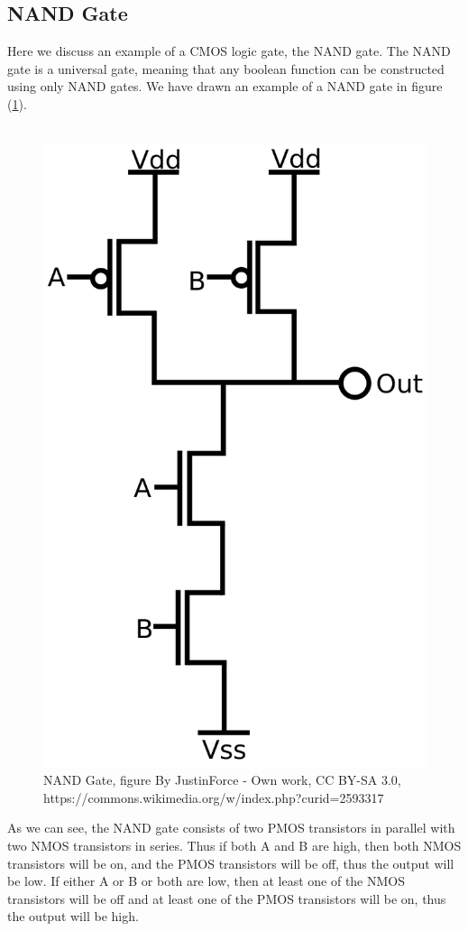 \documentclass[
  reprint,
  amsmath,amssymb,
  aps
]{revtex4-1}
\begin{document}
\subsection{NAND Gate}
Here we discuss an example of a CMOS logic gate, the NAND gate. 
The NAND gate is a universal gate, meaning that any boolean function can be constructed using only NAND gates. We have 
drawn an example of a NAND gate in figure (\ref{fig: NAND gate}).\\\\
\begin{figure}[H]
    \centering
    \includegraphics[width=0.75\linewidth]{cmos_nand_gate.png}
    \caption{NAND Gate, figure By JustinForce - Own work, CC BY-SA 3.0, https://commons.wikimedia.org/w/index.php?curid=2593317}
    \label{fig: NAND gate}
\end{figure}
As we can see, the NAND gate consists of two PMOS transistors in parallel with two NMOS transistors in series. Thus if both A and 
B are high, then both NMOS transistors will be on, and the PMOS transistors will be off, thus the output will be low. If either A or B 
or both are low, then at least one of the NMOS transistors will be off and at least one of the PMOS transistors will be on, thus the
output will be high.
\end{document}
